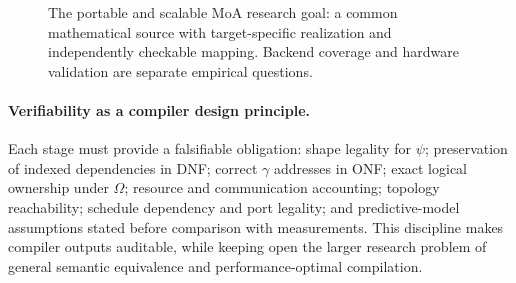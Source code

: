 \documentclass[11pt]{article}
\begin{document}
\begin{figure}[t]
\centering
{}
\caption{The portable and scalable MoA research goal: a common
mathematical source with target-specific realization and independently
checkable mapping. Backend coverage and hardware validation are
separate empirical questions.}
\label{step108:fig:moa-portable-backends}
\end{figure}

\paragraph{Verifiability as a compiler design principle.}
Each stage must provide a falsifiable obligation: shape legality for
$\psi$; preservation of indexed dependencies in DNF; correct
$\gamma$ addresses in ONF; exact logical ownership under $\Omega$;
resource and communication accounting; topology reachability;
schedule dependency and port legality; and predictive-model
assumptions stated before comparison with measurements.  This
discipline makes compiler outputs auditable, while keeping open the
larger research problem of general semantic equivalence and
performance-optimal compilation.
\end{document}
